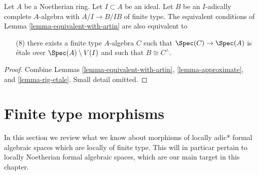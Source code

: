 \begin{lemma}
\label{lemma-approximate-by-etale-over-complement}
Let $A$ be a Noetherian ring. Let $I \subset A$ be an ideal.
Let $B$ be an $I$-adically complete $A$-algebra with $A/I \to B/IB$
of finite type. The equivalent conditions of
Lemma \ref{lemma-equivalent-with-artin} are also equivalent to
\begin{enumerate}
\item[(8)]
\label{item-algebraize}
there exists a finite type $A$-algebra $C$ such that
$\Spec(C) \to \Spec(A)$ is \'etale over $\Spec(A) \setminus V(I)$
and such that $B \cong C^\wedge$.
\end{enumerate}
\end{lemma}

\begin{proof}
Combine Lemmas \ref{lemma-equivalent-with-artin}, \ref{lemma-approximate}, and
\ref{lemma-rig-etale}. Small detail omitted.
\end{proof}




\section{Finite type morphisms}
\label{section-finite-type}

\noindent
In this section we review what we know about morphisms of locally adic*
formal algebraic spaces which are locally of finite type. This will in
particar pertain to locally Noetherian formal algebraic spaces, which
are our main target in this chapter.

